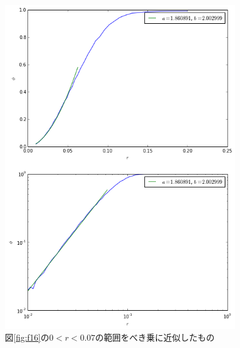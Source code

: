 \begin{figure}[H]
    \begin{center}
        \includegraphics[width=10cm]{../img/r_phi_1_power.png}
        \caption{図\ref{fig:f16}の$0<r<0.07$の範囲をべき乗に近似したもの}
        \label{fig:f17}
    \end{center}
\end{figure}

